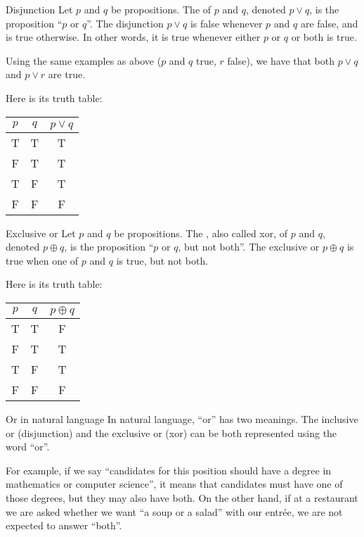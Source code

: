 \documentclass{article}
\begin{document}
\begin{parag}{Disjunction}
    Let $p$ and $q$ be propositions. The  of $p$ and $q$, denoted $p \lor q$, is the proposition ``$p$ or $q$''. The disjunction $p \lor q$ is false whenever $p$ and $q$ are false, and is true otherwise. In other words, it is true whenever either $p$ or $q$ or both is true.

    Using the same examples as above ($p$ and $q$ true, $r$ false), we have that both $p \lor q$ and $p \lor r$ are true.

    Here is its truth table:
    \begin{center}
    \begin{tabular}{c|c|c}
        $p$ & $q$ & $p \lor q$  \\
        \hline
        T & T & T \\
        F & T & T \\
        T & F & T \\
        F & F & F
    \end{tabular}
    \end{center}
\end{parag}

\begin{parag}{Exclusive or}
    Let $p$ and $q$ be propositions. The , also called xor, of $p$ and $q$, denoted $p \oplus q$, is the proposition ``$p$ or $q$, but not both''. The exclusive or $p \oplus q$ is true when one of $p$ and $q$ is true, but not both.

    Here is its truth table:
    \begin{center}
    \begin{tabular}{cc|c}
        $p$ & $q$ & $p \oplus q$ \\
        \hline
        T & T & F \\
        F & T & T \\
        T & F & T \\
        F & F & F
    \end{tabular}
    \end{center}
\end{parag}

\begin{parag}{Or in natural language}
    In natural language, ``or'' has two meanings. The inclusive or (disjunction) and the exclusive or (xor) can be both represented using the word ``or''.

    For example, if we say ``candidates for this position should have a degree in mathematics or computer science'', it means that candidates must have one of those degrees, but they may also have both. On the other hand, if at a restaurant we are asked whether we want ``a soup or a salad'' with our entrée, we are not expected to answer ``both''.
\end{parag}
\end{document}
